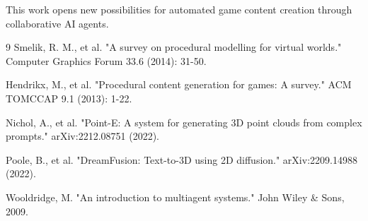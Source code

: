 \documentclass[11pt,a4paper]{article}
\begin{document}
This work opens new possibilities for automated game content creation through collaborative AI agents.

\begin{thebibliography}{9}
 Smelik, R. M., et al. "A survey on procedural modelling for virtual worlds." Computer Graphics Forum 33.6 (2014): 31-50.

 Hendrikx, M., et al. "Procedural content generation for games: A survey." ACM TOMCCAP 9.1 (2013): 1-22.

 Nichol, A., et al. "Point-E: A system for generating 3D point clouds from complex prompts." arXiv:2212.08751 (2022).

 Poole, B., et al. "DreamFusion: Text-to-3D using 2D diffusion." arXiv:2209.14988 (2022).

 Wooldridge, M. "An introduction to multiagent systems." John Wiley \& Sons, 2009.
\end{thebibliography}
\end{document}
